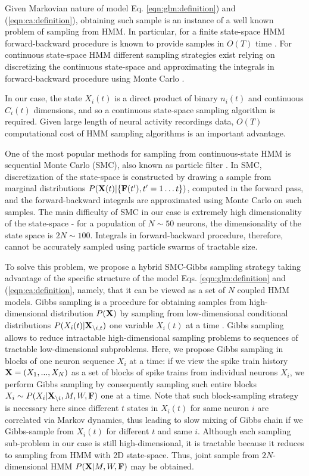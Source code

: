 Given Markovian nature of model Eq. \eqref{eqn:glm:definition}) and (\ref{eqn:ca:definition}), obtaining such sample is an instance of a well known problem of sampling from HMM. In particular, for a finite state-space HMM forward-backward procedure is known to provide samples in  $O(T)$ time \cite{RAB89}. For continuous state-space HMM different sampling strategies exist relying on discretizing the continuous state-space and approximating the integrals in forward-backward procedure using Monte Carlo \cite{DFG01, MINKAPHD, Fearnhead2003, koyama08, Andrieu2007, NBR03}.

In our case, the state $X_i(t)$ is a direct product of binary $n_i(t)$ and continuous $C_i(t)$ dimensions, and so a continuous state-space sampling algorithm is required.
Given large length of neural activity recordings data, $O(T)$ computational cost of HMM sampling algorithms is an important advantage.

One of the most popular methods for sampling from continuous-state HMM is sequential Monte Carlo (SMC), also known as particle filter \cite{DFG01}. In SMC, discretization of the state-space is constructed by drawing a sample from marginal distributions  $P({\bf X}(t)|\{{\bf F}(t'), t'=1\ldots t\})$, computed in the forward pass, and the forward-backward integrals are approximated using Monte Carlo on such samples. The main difficulty of SMC in our case is extremely high dimensionality of the state-space - for a population of $N\sim 50$ neurons, the dimensionality of the state space is $2N\sim 100$. Integrals in forward-backward procedure, therefore, cannot be accurately sampled using particle swarms of tractable size.

To solve this problem, we propose a hybrid SMC-Gibbs sampling strategy taking advantage of the specific structure of the model Eqs. \eqref{eqn:glm:definition} and (\ref{eqn:ca:definition}, namely, that it can be viewed as a set of $N$ coupled HMM models. Gibbs sampling is a procedure for obtaining samples from high-dimensional distribution $P({\bf X})$ by sampling from low-dimensional conditional distributions $P(X_{i}(t)|{\bf X}_{\backslash i, t})$ one variable $X_{i}(t)$ at a time \cite{Gelfand1990}.  Gibbs sampling allows to reduce intractable high-dimensional sampling problems to sequences of tractable low-dimensional subproblems.  Here, we propose Gibbs sampling in blocks of one neuron sequence $X_{i}$ at a time: if we view the spike train history ${\bf X}=(X_1, ..., X_N)$ as a set of blocks of spike trains from individual neurons $X_i$, we perform Gibbs sampling by consequently sampling such entire blocks $X_i\sim P(X_{i}|{\bf X}_{\backslash i}, M, W, {\bf F})$ one at a time.  Note that such block-sampling strategy is necessary here since different $t$ states in $X_i(t)$ for same neuron $i$ are correlated via Markov dynamics, thus leading to slow mixing of Gibbs chain if we Gibbs-sample from $X_i(t)$ for different $t$ and same $i$.  Although each sampling sub-problem in our case is still high-dimensional, it is tractable because it reduces to sampling from HMM with 2D state-space. Thus, joint sample from $2N$-dimensional HMM $P({\bf X}|M, W, {\bf F})$ may be obtained.

